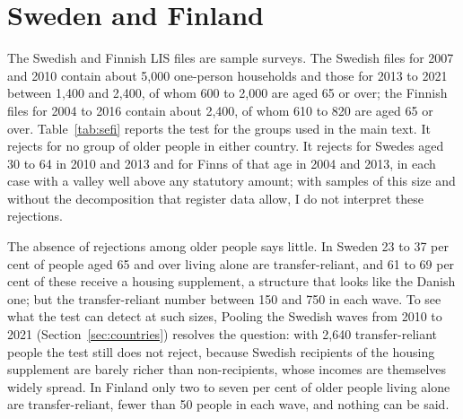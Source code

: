 \section{Sweden and Finland}\label{app:sefi}

The Swedish and Finnish LIS files are sample surveys. The Swedish files for 2007 and 2010 contain about 5{,}000 one-person households and those for 2013 to 2021 between 1{,}400 and 2{,}400, of whom 600 to 2{,}000 are aged 65 or over; the Finnish files for 2004 to 2016 contain about 2{,}400, of whom 610 to 820 are aged 65 or over. Table~\ref{tab:sefi} reports the test for the groups used in the main text. It rejects for no group of older people in either country. It rejects for Swedes aged 30 to 64 in 2010 and 2013 and for Finns of that age in 2004 and 2013, in each case with a valley well above any statutory amount; with samples of this size and without the decomposition that register data allow, I do not interpret these rejections.

The absence of rejections among older people says little. In Sweden 23 to 37 per cent of people aged 65 and over living alone are transfer-reliant, and 61 to 69 per cent of these receive a housing supplement, a structure that looks like the Danish one; but the transfer-reliant number between 150 and 750 in each wave. To see what the test can detect at such sizes,  Pooling the Swedish waves from 2010 to 2021 (Section~\ref{sec:countries}) resolves the question: with 2{,}640 transfer-reliant people the test still does not reject, because Swedish recipients of the housing supplement are barely richer than non-recipients, whose incomes are themselves widely spread. In Finland only two to seven per cent of older people living alone are transfer-reliant, fewer than 50 people in each wave, and nothing can be said.

